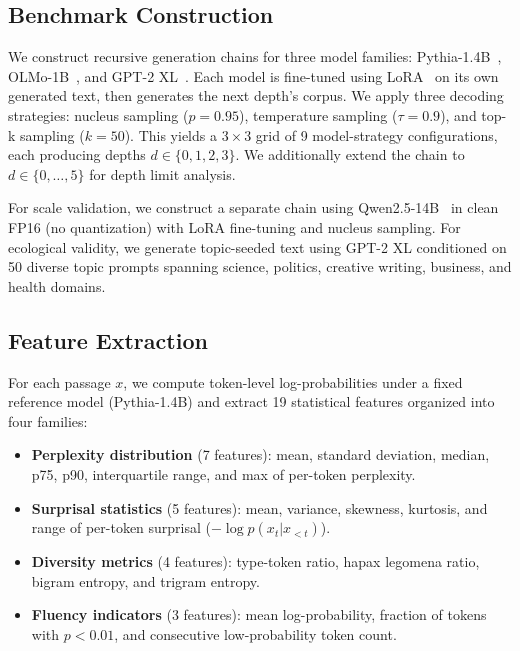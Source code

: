 \documentclass[11pt,a4paper]{article}
\begin{document}
\subsection{Benchmark Construction}

We construct recursive generation chains for three model families: Pythia-1.4B~\citep{biderman2023pythia}, OLMo-1B~\citep{groeneveld2024olmo}, and GPT-2 XL~\citep{radford2019language}. Each model is fine-tuned using LoRA~\citep{hu2022lora} on its own generated text, then generates the next depth's corpus. We apply three decoding strategies: nucleus sampling ($p=0.95$), temperature sampling ($\tau=0.9$), and top-k sampling ($k=50$). This yields a $3 \times 3$ grid of 9 model-strategy configurations, each producing depths $d \in \{0, 1, 2, 3\}$. We additionally extend the chain to $d \in \{0, \ldots, 5\}$ for depth limit analysis.

For scale validation, we construct a separate chain using Qwen2.5-14B~\citep{yang2024qwen2} in clean FP16 (no quantization) with LoRA fine-tuning and nucleus sampling. For ecological validity, we generate topic-seeded text using GPT-2 XL conditioned on 50 diverse topic prompts spanning science, politics, creative writing, business, and health domains.

\subsection{Feature Extraction}
\label{sec:features}

For each passage $x$, we compute token-level log-probabilities under a fixed reference model (Pythia-1.4B) and extract 19 statistical features organized into four families:

\begin{itemize}[nosep,leftmargin=1.5em]
    \item \textbf{Perplexity distribution} (7 features): mean, standard deviation, median, p75, p90, interquartile range, and max of per-token perplexity.
    \item \textbf{Surprisal statistics} (5 features): mean, variance, skewness, kurtosis, and range of per-token surprisal ($-\log p(x_t | x_{<t})$).
    \item \textbf{Diversity metrics} (4 features): type-token ratio, hapax legomena ratio, bigram entropy, and trigram entropy.
    \item \textbf{Fluency indicators} (3 features): mean log-probability, fraction of tokens with $p < 0.01$, and consecutive low-probability token count.
\end{itemize}
\end{document}
